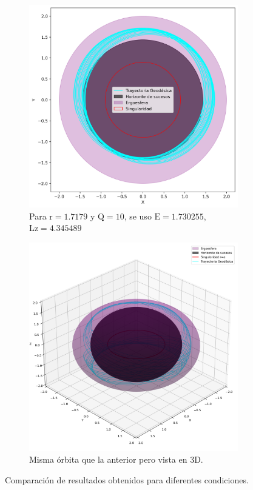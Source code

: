 \begin{figure}[H]
    \begin{subfigure}{0.5\textwidth}
        \includegraphics[width=\linewidth]{AgujerosNegros/kerr/geodesics_plots/geodesica_circular_r1,71_Q10_planoxy.png}
        \caption{Para $\mathrm{r}=1.7179$ y $\mathrm{Q}=10$, se uso $\mathrm{E}=1.730255$, $\mathrm{Lz}=4.345489$}
    \end{subfigure}
    \begin{subfigure}{0.5\textwidth}
        \includegraphics[width=\linewidth]{AgujerosNegros/kerr/geodesics_plots/geodesica_circular_r1,71_Q10.png}
        \caption{Misma órbita que la anterior pero vista en 3D.}
    \end{subfigure}
    \caption{Comparación de resultados obtenidos para diferentes condiciones.}
\end{figure}


